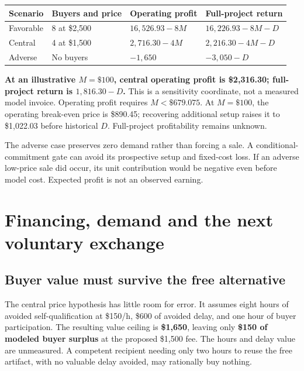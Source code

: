 \documentclass[
  10pt,
]{article}
\newcommand{\editionbreak}{\par\bigskip\Needspace{8\baselineskip}}
\begin{document}
\begin{longtable}[]{@{}llll@{}}
\toprule\noalign{}
Scenario & Buyers and price & Operating profit & Full-project return \\
\midrule\noalign{}
\endhead
\bottomrule\noalign{}
\endlastfoot
Favorable & 8 at \$2,500 & \(16,526.93-8M\) & \(16,226.93-8M-D\) \\
Central & 4 at \$1,500 & \textbf{\(2,716.30-4M\)} &
\textbf{\(2,216.30-4M-D\)} \\
Adverse & No buyers & \(-1,650\) & \(-3,050-D\) \\
\end{longtable}

\textbf{At an illustrative \(M=\$100\), central operating profit is
\$2,316.30; full-project return is \(1,816.30-D\).} This is a
sensitivity coordinate, not a measured model invoice. Operating profit
requires \(M<\$679.075\). At \(M=\$100\), the operating break-even price
is \$890.45; recovering additional setup raises it to \$1,022.03 before
historical \(D\). Full-project profitability remains unknown.

The adverse case preserves zero demand rather than forcing a sale. A
conditional-commitment gate can avoid its prospective setup and
fixed-cost loss. If an adverse low-price sale did occur, its unit
contribution would be negative even before model cost. Expected profit
is not an observed earning.

\editionbreak

\hypertarget{financing-demand-and-the-next-voluntary-exchange}{%
\section{Financing, demand and the next voluntary
exchange}\label{financing-demand-and-the-next-voluntary-exchange}}

\hypertarget{buyer-value-must-survive-the-free-alternative}{%
\subsection{Buyer value must survive the free
alternative}\label{buyer-value-must-survive-the-free-alternative}}

The central price hypothesis has little room for error. It assumes eight
hours of avoided self-qualification at \$150/h, \$600 of avoided delay,
and one hour of buyer participation. The resulting value ceiling is
\textbf{\$1,650}, leaving only \textbf{\$150 of modeled buyer surplus}
at the proposed \$1,500 fee. The hours and delay value are unmeasured. A
competent recipient needing only two hours to reuse the free artifact,
with no valuable delay avoided, may rationally buy nothing.
\end{document}
